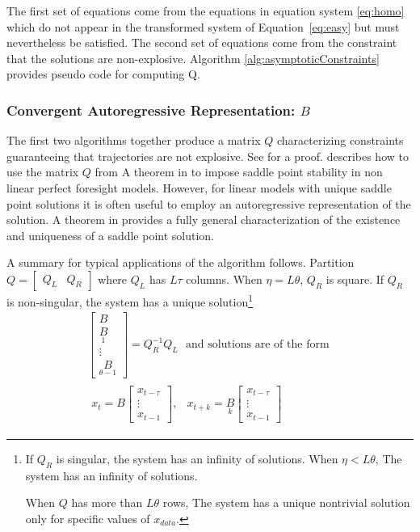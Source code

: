 \documentclass[12pt]{elsart}
\begin{document}
The first set of equations come from the equations in equation system 
\ref{eq:homo} which do not appear in the transformed system 
of Equation~\ref{eq:easy}
but must nevertheless be satisfied. The second set of equations come from the
constraint that the solutions are non-explosive.
Algorithm \ref{alg:asymptoticConstraints} provides pseudo code for computing Q.
  




\subsubsection{Convergent Autoregressive Representation: $B$}
\label{conar}

The first two algorithms  together  produce a matrix $Q$ characterizing
constraints guaranteeing that trajectories are not explosive.  See \cite{anderson10}  for a proof.
\cite{anderson99} describes how to use 
the matrix $Q$ from A theorem in \cite{anderson10}  to impose
saddle point stability in non linear perfect foresight models.
However, for linear models with unique  saddle point
solutions it is often useful to 
employ an autoregressive representation of the solution.
A theorem in \cite{anderson10} 
provides a fully general characterization
of the existence and uniqueness of
a saddle point solution.  

  A summary for typical applications of the algorithm follows.
Partition $Q=
\begin{bmatrix}
  Q_L & Q_R
\end{bmatrix}$ where $Q_L$ has $L\tau$ columns.
When $\eta =L \theta$, $Q_R$ is square.
If  $Q_R$ is non-singular, the system has a unique solution\footnote{
  If $Q_R$ is singular, the system has an infinity of solutions.
  When $\eta <L \theta$,
The system has an infinity of solutions.

  When $Q$ has more than $L \theta$ rows,
The system has a unique nontrivial 
solution only for specific values of $x_{data}$.
}
\begin{gather}
    \begin{bmatrix}
    B \\\underset{1}{B}\\ \vdots \\ \underset{\theta-1}{B}  
  \end{bmatrix}
= Q_R^{-1} Q_L \,\,\text{ and solutions are of the form }\\
\begin{matrix}
x_t=B 
\begin{bmatrix}
  x_{t-\tau}\\
\vdots\\
  x_{t-1}
\end{bmatrix},&
x_{t+k}=\underset{k}{B} 
\begin{bmatrix}
  x_{t-\tau}\\
\vdots\\
  x_{t-1}
\end{bmatrix}
\end{matrix} 
\end{gather}
\end{document}
